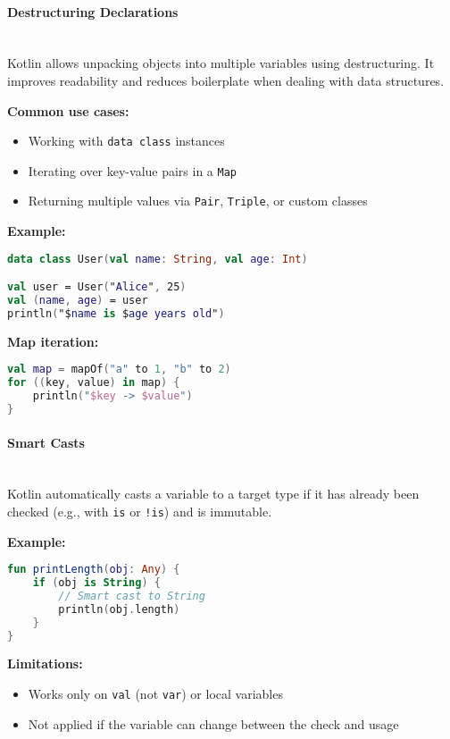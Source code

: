 \documentclass[a4paper,12pt]{article}
\begin{document}
\paragraph{Destructuring Declarations}\mbox{}\\
Kotlin allows unpacking objects into multiple variables using destructuring. It improves readability and reduces boilerplate when dealing with data structures.

\textbf{Common use cases:}
\begin{itemize}
  \item Working with \texttt{data class} instances
  \item Iterating over key-value pairs in a \texttt{Map}
  \item Returning multiple values via \texttt{Pair}, \texttt{Triple}, or custom classes
\end{itemize}

\textbf{Example:}
\begin{lstlisting}[language=Kotlin]
data class User(val name: String, val age: Int)

val user = User("Alice", 25)
val (name, age) = user
println("$name is $age years old")
\end{lstlisting}

\textbf{Map iteration:}
\begin{lstlisting}[language=Kotlin]
val map = mapOf("a" to 1, "b" to 2)
for ((key, value) in map) {
    println("$key -> $value")
}
\end{lstlisting}

\paragraph{Smart Casts}\mbox{}\\
Kotlin automatically casts a variable to a target type if it has already been checked (e.g., with \texttt{is} or \texttt{!is}) and is immutable.

\textbf{Example:}
\begin{lstlisting}[language=Kotlin]
fun printLength(obj: Any) {
    if (obj is String) {
        // Smart cast to String
        println(obj.length)
    }
}
\end{lstlisting}

\textbf{Limitations:}
\begin{itemize}
  \item Works only on \texttt{val} (not \texttt{var}) or local variables
  \item Not applied if the variable can change between the check and usage
\end{itemize}
\end{document}
